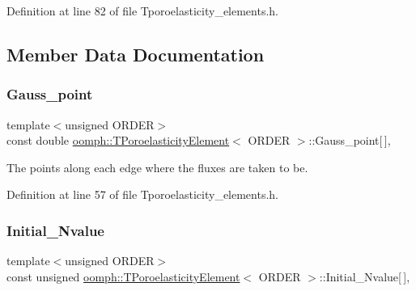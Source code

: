 Definition at line 82 of file Tporoelasticity\+\_\+elements.\+h.



\subsection{Member Data Documentation}
\mbox{\label{classoomph_1_1TPoroelasticityElement_a57b72b30d03fd2c5ca6da2f31d10fe97}} 
\subsubsection{\texorpdfstring{Gauss\+\_\+point}{Gauss\_point}}
{\footnotesize\ttfamily template$<$unsigned O\+R\+D\+ER$>$ \\
const double \hyperlink{classoomph_1_1TPoroelasticityElement}{oomph\+::\+T\+Poroelasticity\+Element}$<$ O\+R\+D\+ER $>$\+::Gauss\+\_\+point\mbox{[}$\,$\mbox{]}\hspace{0.3cm}{\ttfamily [static]}, {\ttfamily [private]}}



The points along each edge where the fluxes are taken to be. 



Definition at line 57 of file Tporoelasticity\+\_\+elements.\+h.

\mbox{\label{classoomph_1_1TPoroelasticityElement_aa906a23cadc727176f0373923dde01f1}} 
\subsubsection{\texorpdfstring{Initial\+\_\+\+Nvalue}{Initial\_Nvalue}}
{\footnotesize\ttfamily template$<$unsigned O\+R\+D\+ER$>$ \\
const unsigned \hyperlink{classoomph_1_1TPoroelasticityElement}{oomph\+::\+T\+Poroelasticity\+Element}$<$ O\+R\+D\+ER $>$\+::Initial\+\_\+\+Nvalue\mbox{[}$\,$\mbox{]}\hspace{0.3cm}{\ttfamily [static]}, {\ttfamily [private]}}



